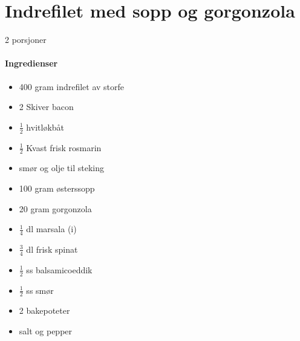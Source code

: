 \section{﻿Indrefilet med sopp og gorgonzola}
2 porsjoner

\paragraph{Ingredienser}
\begin{itemize}[noitemsep]
	\item 400 gram indrefilet av storfe
	\item 2 Skiver bacon
	\item $\frac{1}{2}$  hvitløkbåt
	\item $\frac{1}{2}$  Kvast frisk rosmarin
	\item smør og olje til steking
	\item 100 gram østerssopp
	\item 20 gram gorgonzola
	\item $\frac{1}{4}$  dl marsala (i)
	\item $\frac{3}{4}$  dl frisk spinat
	\item $\frac{1}{2}$  ss balsamicoeddik
	\item $\frac{1}{2}$  ss smør
	\item 2 bakepoteter
	\item salt og pepper


\end{itemize}

